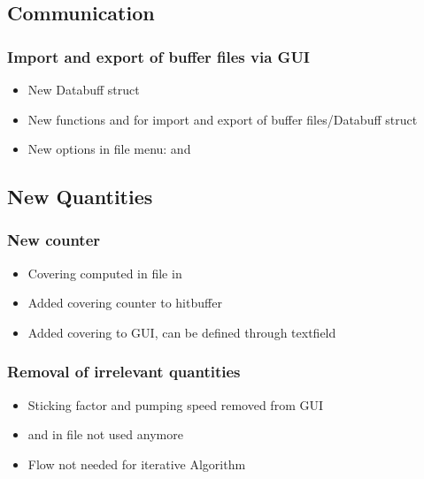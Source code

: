 \subsection{Communication}
\subsubsection{Import and export of buffer files via GUI}
\begin{itemize}[noitemsep,topsep=0pt]
\item New Databuff struct 
\item New functions  and  for import and export of buffer files/Databuff struct
\item New options in file menu:  and 
\end{itemize}

\subsection{New Quantities}
\subsubsection{New counter }
\begin{itemize}[noitemsep,topsep=0pt]
\item Covering computed in  file in 
\item Added covering counter to hitbuffer
\item Added covering to GUI, can be defined through textfield
\end{itemize}

\subsubsection{Removal of irrelevant quantities}
\begin{itemize}[noitemsep,topsep=0pt]
\item Sticking factor and pumping speed removed from GUI
\item {} and  in  file not used anymore
\item Flow not needed for iterative Algorithm
\end{itemize}

